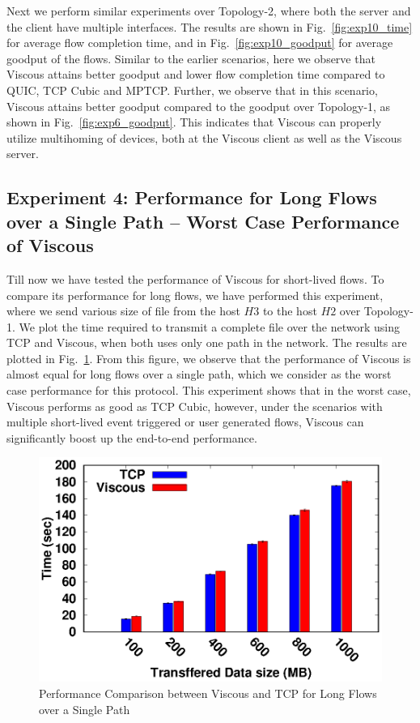 Next we perform similar experiments over Topology-2, where both the server and the client have multiple interfaces. The results are shown in Fig.~\ref{fig:exp10_time} for average flow completion time, and in Fig.~\ref{fig:exp10_goodput} for average goodput of the flows. Similar to the earlier scenarios, here we observe that Viscous attains better goodput and lower flow completion time compared to QUIC, TCP Cubic and MPTCP. Further, we observe that in this scenario, Viscous attains better goodput compared to the goodput over Topology-1, as shown in Fig.~\ref{fig:exp6_goodput}. This indicates that Viscous can properly utilize multihoming of devices, both at the Viscous client as well as the Viscous server. 


\subsection{Experiment 4: Performance for Long Flows over a Single Path -- Worst Case Performance of Viscous}

Till now we have tested the performance of Viscous for short-lived flows. To compare its performance for long flows, we have performed this experiment, where we send various size of file from the host $H3$ to the host $H2$ over Topology-1. We plot the time required to transmit a complete file over the network using TCP and Viscous, when both uses only one path in the network. The results are plotted in Fig.~\ref{fig:exp1_singlepath}. From this figure, we observe that the performance of Viscous is almost equal for long flows over a single path, which we consider as the worst case performance for this protocol. This experiment shows that in the worst case, Viscous performs as good as TCP Cubic, however, under the scenarios with multiple short-lived event triggered or user generated flows, Viscous can significantly boost up the end-to-end performance. 

\begin{figure}[!t]
    \centering
    \includegraphics[width=\linewidth]{img/exp1/tcp-mpudp_res}
    \caption{Performance Comparison between Viscous and TCP for Long Flows over a Single Path}
    \label{fig:exp1_singlepath}
\end{figure}

